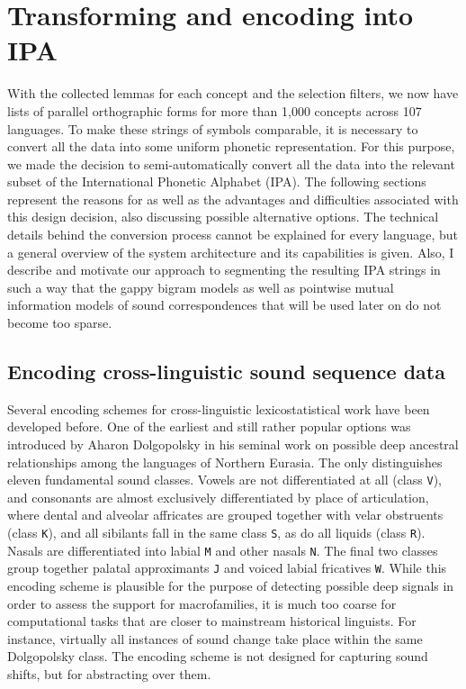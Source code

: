 \section{Transforming and encoding into IPA}
With the collected lemmas for each concept and the selection filters, we now have lists of parallel orthographic forms for more than 1,000 concepts across 107 languages. To make these strings of symbols comparable, it is necessary to convert all the data into some uniform phonetic representation. For this purpose, we made the decision to semi-automatically convert all the data into the relevant subset of the International Phonetic Alphabet (IPA). The following sections represent the reasons for as well as the advantages and difficulties associated with this design decision, also discussing possible alternative options. The technical details behind the conversion process cannot be explained for every language, but a general overview of the system architecture and its capabilities is given. Also, I describe and motivate our approach to segmenting the resulting IPA strings in such a way that the gappy bigram models as well as pointwise mutual information models of sound correspondences that will be used later on do not become too sparse.

\subsection{Encoding cross-linguistic sound sequence data}
Several encoding schemes for cross-linguistic lexicostatistical work have been developed before. One of the earliest and still rather popular options was introduced by Aharon Dolgopolsky in his seminal work \citep{dolgopolsky1964} on possible deep ancestral relationships among the languages of Northern Eurasia. The  only distinguishes eleven fundamental sound classes. Vowels are not differentiated at all (class \texttt{V}), and consonants are almost exclusively differentiated by place of articulation, where dental and alveolar affricates are grouped together with velar obstruents (class \texttt{K}), and all sibilants fall in the same class \texttt{S}, as do all liquids (class \texttt{R}). Nasals are differentiated into labial \texttt{M} and other nasals \texttt{N}. The final two classes group together palatal approximants \texttt{J} and voiced labial fricatives \texttt{W}. While this encoding scheme is plausible for the purpose of detecting possible deep signals in order to assess the support for macrofamilies, it is much too coarse for computational tasks that are closer to mainstream historical linguists. For instance, virtually all instances of sound change take place within the same Dolgopolsky class. The encoding scheme is not designed for capturing sound shifts, but for abstracting over them.

